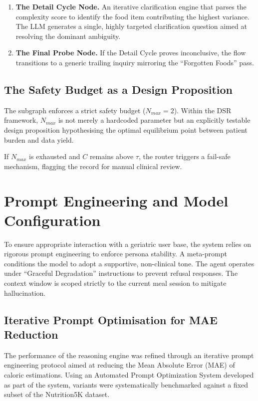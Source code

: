 \begin{enumerate}
    \item \textbf{The Detail Cycle Node.} An iterative clarification engine that parses the complexity score to identify the food item contributing the highest variance. The LLM generates a single, highly targeted clarification question aimed at resolving the dominant ambiguity.

    \item \textbf{The Final Probe Node.} If the Detail Cycle proves inconclusive, the flow transitions to a generic trailing inquiry mirroring the ``Forgotten Foods'' pass.
\end{enumerate}

\subsection{The Safety Budget as a Design Proposition}

The subgraph enforces a strict safety budget ($N_{max}=2$). Within the DSR framework, $N_{max}$ is not merely a hardcoded parameter but an explicitly testable design proposition hypothesising the optimal equilibrium point between patient burden and data yield.

If $N_{max}$ is exhausted and $C$ remains above $\tau$, the router triggers a fail-safe mechanism, flagging the record for manual clinical review.

\section{Prompt Engineering and Model Configuration}
\label{sec:prompt-engineering}

To ensure appropriate interaction with a geriatric user base, the system relies on rigorous prompt engineering to enforce persona stability. A meta-prompt conditions the model to adopt a supportive, non-clinical tone. The agent operates under ``Graceful Degradation'' instructions to prevent refusal responses. The context window is scoped strictly to the current meal session to mitigate hallucination.

\subsection{Iterative Prompt Optimisation for MAE Reduction}

The performance of the reasoning engine was refined through an iterative prompt engineering protocol aimed at reducing the Mean Absolute Error (MAE) of caloric estimations. Using an Automated Prompt Optimization System developed as part of the system, variants were systematically benchmarked against a fixed subset of the Nutrition5K dataset.

